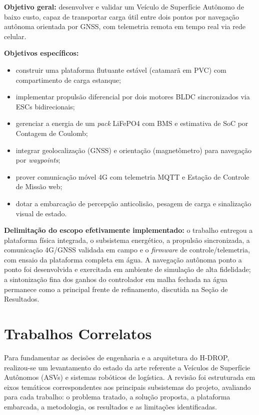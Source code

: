 \documentclass[12pt,a4paper]{article}
\begin{document}
\textbf{Objetivo geral:} desenvolver e validar um Veículo de Superfície Autônomo de baixo custo, capaz de transportar carga útil entre dois pontos por navegação autônoma orientada por GNSS, com telemetria remota em tempo real via rede celular.

\noindent\textbf{Objetivos específicos:}
\begin{itemize}
\item construir uma plataforma flutuante estável (catamarã em PVC) com compartimento de carga estanque;
\item implementar propulsão diferencial por dois motores BLDC sincronizados via ESCs bidirecionais;
\item gerenciar a energia de um \textit{pack} LiFePO4 com BMS e estimativa de SoC por Contagem de Coulomb;
\item integrar geolocalização (GNSS) e orientação (magnetômetro) para navegação por \textit{waypoints};
\item prover comunicação móvel 4G com telemetria MQTT e Estação de Controle de Missão web;
\item dotar a embarcação de percepção anticolisão, pesagem de carga e sinalização visual de estado.
\end{itemize}

\textbf{Delimitação do escopo efetivamente implementado:} o trabalho entregou a plataforma física integrada, o subsistema energético, a propulsão sincronizada, a comunicação 4G/GNSS validada em campo e o \textit{firmware} de controle/telemetria, com ensaio da plataforma completa em água. A navegação autônoma ponto a ponto foi desenvolvida e exercitada em ambiente de simulação de alta fidelidade; a sintonização fina dos ganhos do controlador em malha fechada na água permanece como a principal frente de refinamento, discutida na Seção de Resultados.

\section{Trabalhos Correlatos}

Para fundamentar as decisões de engenharia e a arquitetura do H-DROP, realizou-se um levantamento do estado da arte referente a Veículos de Superfície Autônomos (ASVs) e sistemas robóticos de logística. A revisão foi estruturada em eixos temáticos correspondentes aos principais subsistemas do projeto, avaliando para cada trabalho: o problema tratado, a solução proposta, a plataforma embarcada, a metodologia, os resultados e as limitações identificadas.
\end{document}
